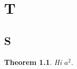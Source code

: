 \documentclass{book}
\theoremstyle{plain}
\newtheorem{theorem}{Theorem}[section]
\begin{document}
\chapter{T}\section{S}
\begin{theorem}\label{t:x}Hi $a^2$.\end{theorem}
\end{document}
